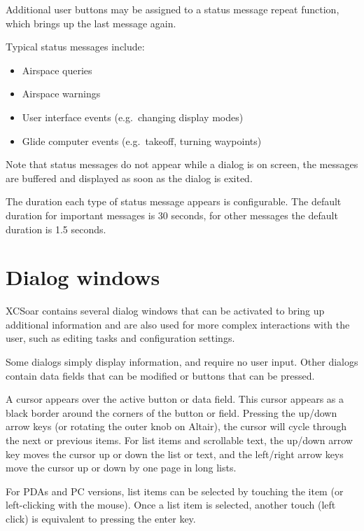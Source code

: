 \documentclass[a4paper,12pt]{refrep}
\begin{document}
Additional user buttons may be assigned to a status message repeat
function, which brings up the last message again.

Typical status messages include:
\begin{itemize}
\item Airspace queries
\item Airspace warnings
\item User interface events (e.g.\ changing display modes)
\item Glide computer events (e.g.\ takeoff, turning waypoints)
\end{itemize}


Note that status messages do not appear while a dialog is on screen,
the messages are buffered and displayed as soon as the dialog is
exited.

\tip The duration each type of status message appears is configurable.
The default duration for important messages is 30 seconds, for other
messages the default duration is 1.5 seconds.

\section{Dialog windows}\label{sec:dialog-windows}

XCSoar contains several dialog windows that can be activated to bring
up additional information and are also used for more complex
interactions with the user, such as editing tasks and configuration
settings.

Some dialogs simply display information, and require no user input.
Other dialogs contain data fields that can be modified or buttons that
can be pressed.  

A cursor appears over the active button or data field.  This cursor
appears as a black border around the corners of the button or field.
Pressing the up/down arrow keys (or rotating the outer knob on
Altair), the cursor will cycle through the next or previous items.
For list items and scrollable text, the up/down arrow key moves the
cursor up or down the list or text, and the left/right arrow keys
move the cursor up or down by one page in long lists.

For PDAs and PC versions, list items can be selected by touching the
item (or left-clicking with the mouse).  Once a list item is selected,
another touch (left click) is equivalent to pressing the enter key.
\end{document}
